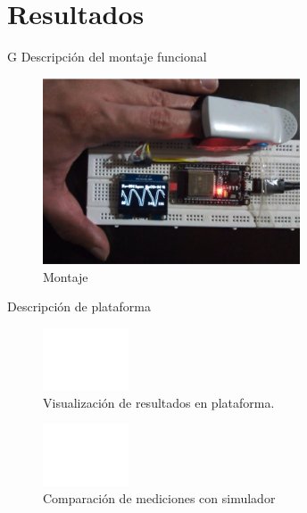 \documentclass[journal]{IEEEtran}
\begin{document}
\section{Resultados}
{\color{blue}G}
Descripción del montaje funcional



\begin{figure}[!h]
	\centering
	\includegraphics[width=3in]{montaje_final.png}
	\caption{Montaje}
	\label{montaje_generador_rpi}
\end{figure}


Descripción de plataforma

\begin{figure}[!h]
	\centering

	\includegraphics[width=1in]{plataforma.png}
	\caption{Visualización de resultados en plataforma.}
	\label{montaje_generador_rpi}
\end{figure}

\begin{figure}[!h]
	\centering
	\includegraphics[width=1in]{Validacion_resultados.png}
	\caption{Comparación de mediciones con simulador}
	\label{montaje_generador_rpi}
\end{figure}
\end{document}
